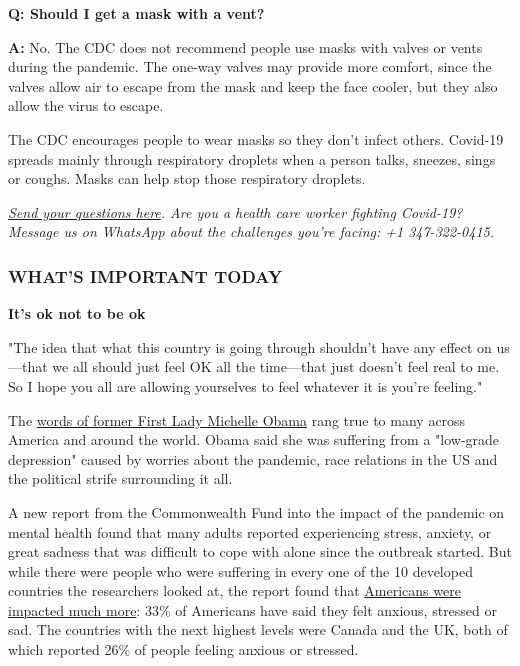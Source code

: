 \textbf{Q: Should I get a mask with a vent?}

\textbf{A:} No. The CDC does not recommend people use masks with valves
or vents during the pandemic. The one-way valves may provide more
comfort, since the valves allow air to escape from the mask and keep the
face cooler, but they also allow the virus to escape.

The CDC encourages people to wear masks so they don't infect others.
Covid-19 spreads mainly through respiratory droplets when a person
talks, sneezes, sings or coughs. Masks can help stop those respiratory
droplets.

\href{https://www.cnn.com/2020/03/04/us/coronavirus-town-hall-questions}{\emph{Send
your questions here}}\emph{. Are you a health care worker fighting
Covid-19? Message us on WhatsApp about the challenges you're facing: +1
347-322-0415.}

\hypertarget{whats-important-today}{%
\subsubsection{\texorpdfstring{\textbf{WHAT'S IMPORTANT
TODAY}}{WHAT'S IMPORTANT TODAY}}\label{whats-important-today}}

\textbf{It's ok not to be ok}

"The idea that what this country is going through shouldn't have any
effect on us---that we all should just feel OK all the time---that just
doesn't feel real to me. So I hope you all are allowing yourselves to
feel whatever it is you're feeling."

The
\href{https://cnn.com/2020/08/06/us/michelle-obama-coronavirus-depression-trnd/index.html}{words
of former First Lady Michelle Obama} rang true to many across America
and around the world. Obama said she was suffering from a "low-grade
depression" caused by worries about the pandemic, race relations in the
US and the political strife surrounding it all.

A new report from the Commonwealth Fund into the impact of the pandemic
on mental health found that many adults reported experiencing stress,
anxiety, or great sadness that was difficult to cope with alone since
the outbreak started. But while there were people who were suffering in
every one of the 10 developed countries the researchers looked at, the
report found that
\href{https://cnn.com/2020/08/06/health/us-coronavirus-mental-health-problems-wellness/index.html}{Americans
were impacted much more}: 33\% of Americans have said they felt anxious,
stressed or sad. The countries with the next highest levels were Canada
and the UK, both of which reported 26\% of people feeling anxious or
stressed.

